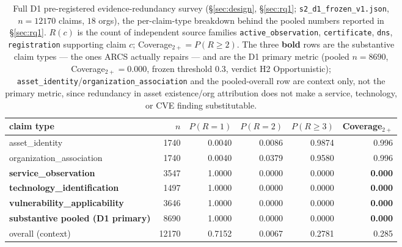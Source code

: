 \begin{table}[t]\centering\small
\caption{Full D1 pre-registered evidence-redundancy survey (\S\ref{sec:design}, \S\ref{sec:rq1}; \texttt{s2\_d1\_frozen\_v1.json}, $n=12170$ claims, $18$ orgs), the per-claim-type breakdown behind the pooled numbers reported in \S\ref{sec:rq1}. $R(c)$ is the count of independent source families \texttt{active\_observation}, \texttt{certificate}, \texttt{dns}, \texttt{registration} supporting claim $c$; Coverage$_{2+}=P(R\geq2)$. The three \textbf{bold} rows are the substantive claim types --- the ones ARCS actually repairs --- and are the D1 primary metric (pooled $n=8690$, Coverage$_{2+}=0.000$, frozen threshold $0.3$, verdict H2 Opportunistic); \texttt{asset\_identity}/\texttt{organization\_association} and the pooled-overall row are context only, not the primary metric, since redundancy in asset existence/org attribution does not make a service, technology, or CVE finding substitutable.}
\label{tab:d1-full}
\begin{tabular}{lrrrrr}\toprule
claim type & $n$ & $P(R=1)$ & $P(R=2)$ & $P(R\geq3)$ & Coverage$_{2+}$\\\midrule
asset\_identity & 1740 & 0.0040 & 0.0086 & 0.9874 & 0.996\\
organization\_association & 1740 & 0.0040 & 0.0379 & 0.9580 & 0.996\\
\textbf{service\_observation} & 3547 & 1.0000 & 0.0000 & 0.0000 & \textbf{0.000}\\
\textbf{technology\_identification} & 1497 & 1.0000 & 0.0000 & 0.0000 & \textbf{0.000}\\
\textbf{vulnerability\_applicability} & 3646 & 1.0000 & 0.0000 & 0.0000 & \textbf{0.000}\\
\midrule
\textbf{substantive pooled (D1 primary)} & 8690 & 1.0000 & 0.0000 & 0.0000 & \textbf{0.000}\\
overall (context) & 12170 & 0.7152 & 0.0067 & 0.2781 & 0.285\\
\bottomrule\end{tabular}\end{table}
